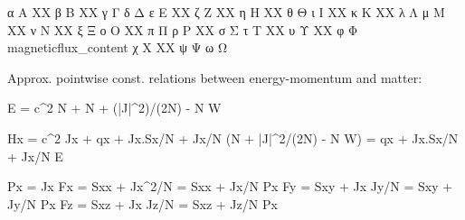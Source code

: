 α
Α XX
β
Β XX
γ
Γ
δ
Δ
ε
Ε XX
ζ
Ζ XX
η
Η XX
θ
Θ
ι
Ι XX
κ
Κ XX
λ
Λ
μ
Μ XX
ν
Ν XX
ξ
Ξ
ο
Ο XX
π
Π
ρ
Ρ XX
σ
Σ
τ
Τ XX
υ
Υ XX
φ
Φ magneticflux_content
χ
Χ XX
ψ
Ψ
ω
Ω

Approx. pointwise const. relations between energy-momentum and matter:

E = c^2 \rho N + \eps N + \rho (|J|^2)/(2N) - \rho N W

Hx = c^2 \rho Jx + qx + Jx.Sx/N + Jx/N (\eps N + \rho |J|^2/(2N) - \rho N W)
   = qx + Jx.Sx/N + Jx/N E

Px = \rho Jx
Fx = Sxx + \rho Jx^2/N
   = Sxx + Jx/N Px
Fy = Sxy + \rho Jx Jy/N
   = Sxy + Jy/N Px
Fz = Sxz + \rho Jx Jz/N
   = Sxz + Jz/N Px



